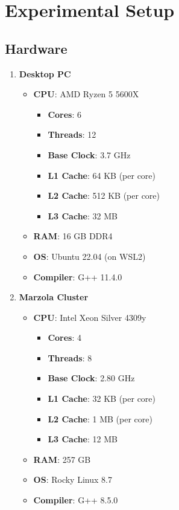 \documentclass{article}
\begin{document}
\section{Experimental Setup}
\subsection{Hardware}
\begin{minipage}{\textwidth}
    \begin{multicols}{2}
        \raggedcolumns
        \begin{enumerate}
            \item \textbf{Desktop PC}
            \begin{itemize}
                \item \textbf{CPU}: AMD Ryzen 5 5600X
                \begin{itemize}
                    \item \textbf{Cores}: 6
                    \item \textbf{Threads}: 12
                    \item \textbf{Base Clock}: 3.7 GHz
                    \item \textbf{L1 Cache}: 64 KB (per core)
                    \item \textbf{L2 Cache}: 512 KB (per core)
                    \item \textbf{L3 Cache}: 32 MB
                \end{itemize}
                \item \textbf{RAM}: 16 GB DDR4
                \item \textbf{OS}: Ubuntu 22.04 (on WSL2)
                \item \textbf{Compiler}: G++ 11.4.0
            \end{itemize}
            \columnbreak
            \item \textbf{Marzola Cluster}
            \begin{itemize}
                \item \textbf{CPU}: Intel Xeon Silver 4309y
                \begin{itemize}
                    \item \textbf{Cores}: 4
                    \item \textbf{Threads}: 8
                    \item \textbf{Base Clock}: 2.80 GHz
                    \item \textbf{L1 Cache}: 32 KB (per core)
                    \item \textbf{L2 Cache}: 1 MB (per core)
                    \item \textbf{L3 Cache}: 12 MB
                \end{itemize}
                \item \textbf{RAM}: 257 GB
                \item \textbf{OS}: Rocky Linux 8.7
                \item \textbf{Compiler}: G++ 8.5.0
            \end{itemize}
        \end{enumerate}
    \end{multicols}
\end{minipage}
\end{document}
